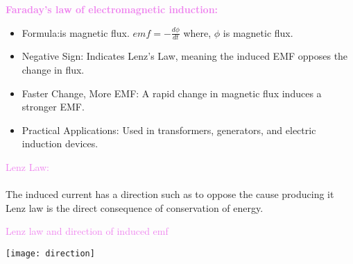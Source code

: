 \documentclass{beamer}
\begin{document}
\begin{frame}
\textcolor{violet}{\textbf{Faraday's law of electromagnetic induction:}}\\
\begin{itemize}
\item Formula:is magnetic flux. $emf=-\frac{d\phi}{dt}$ where, $\phi$ is magnetic flux.
\item Negative Sign: Indicates Lenz's Law, meaning the induced EMF opposes the change in flux.
\item Faster Change, More EMF: A rapid change in magnetic flux induces a stronger EMF.
\item Practical Applications: Used in transformers, generators, and electric induction devices.
\end{itemize}
\textcolor{violet}{Lenz Law:} \\
\\
The induced current has a direction such as to oppose the cause producing it\\
Lenz law is the direct consequence of conservation of energy.
\end{frame}

\begin{frame}
\textcolor{violet}{Lenz law and direction of induced emf}\\
\begin{center}
\texttt{[image: direction]}
\end{center}
\end{frame}
\end{document}
